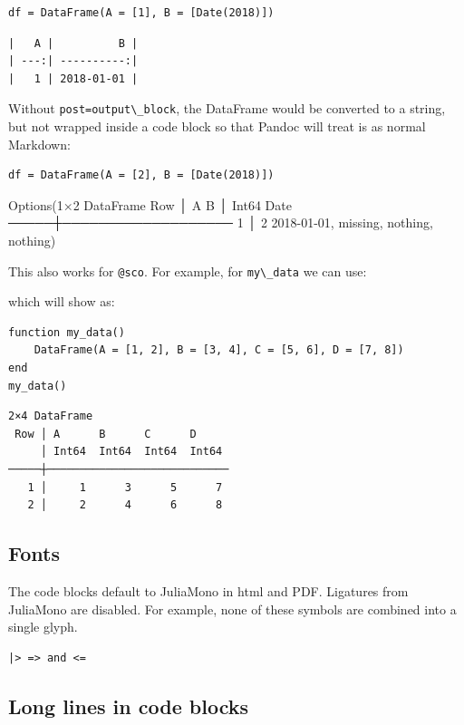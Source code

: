 \documentclass[
  14pt
  american,
  paper=a4,
  ,captions=tableheading
]{scrreprt}
\newcommand{\passthrough}[1]{#1}
\begin{document}
\begin{lstlisting}
df = DataFrame(A = [1], B = [Date(2018)])
\end{lstlisting}

\begin{lstlisting}
|   A |          B |
| ---:| ----------:|
|   1 | 2018-01-01 |
\end{lstlisting}

Without \passthrough{\lstinline!post=output\_block!}, the DataFrame
would be converted to a string, but not wrapped inside a code block so
that Pandoc will treat is as normal Markdown:

\begin{lstlisting}
df = DataFrame(A = [2], B = [Date(2018)])
\end{lstlisting}

Options(1×2 DataFrame Row │ A B │ Int64 Date ─────┼─────────────────── 1
│ 2 2018-01-01, missing, nothing, nothing)

This also works for \passthrough{\lstinline!@sco!}. For example, for
\passthrough{\lstinline!my\_data!} we can use:

which will show as:

\begin{lstlisting}
function my_data()
    DataFrame(A = [1, 2], B = [3, 4], C = [5, 6], D = [7, 8])
end
my_data()
\end{lstlisting}

\begin{lstlisting}
2×4 DataFrame
 Row │ A      B      C      D
     │ Int64  Int64  Int64  Int64
─────┼────────────────────────────
   1 │     1      3      5      7
   2 │     2      4      6      8
\end{lstlisting}

\hypertarget{fonts}{%
\subsection{Fonts}\label{fonts}}

The code blocks default to JuliaMono in html and PDF. Ligatures from
JuliaMono are disabled. For example, none of these symbols are combined
into a single glyph.

\begin{lstlisting}
|> => and <=
\end{lstlisting}

\hypertarget{long-lines-in-code-blocks}{%
\subsection{Long lines in code blocks}\label{long-lines-in-code-blocks}}
\end{document}
